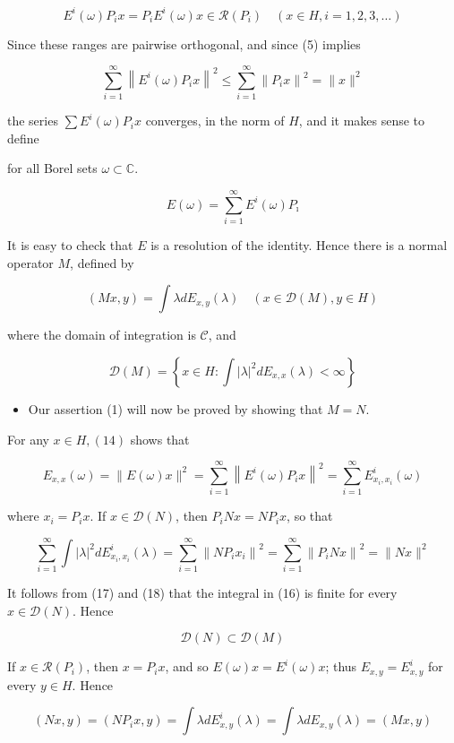 \documentclass[10pt]{article}
\begin{document}
$$
E^{i}(\omega) P_{i} x=P_{i} E^{i}(\omega) x \in \mathscr{R}\left(P_{i}\right) \quad(x \in H, i=1,2,3, \ldots)
$$

Since these ranges are pairwise orthogonal, and since (5) implies

$$
\sum_{i=1}^{\infty}\left\|E^{i}(\omega) P_{i} x\right\|^{2} \leq \sum_{i=1}^{\infty}\left\|P_{i} x\right\|^{2}=\|x\|^{2}
$$

the series $\sum E^{i}(\omega) P_{i} x$ converges, in the norm of $H$, and it makes sense to define

for all Borel sets $\omega \subset \mathbb{C}$.

$$
E(\omega)=\sum_{i=1}^{\infty} E^{i}(\omega) P_{\imath}
$$

It is easy to check that $E$ is a resolution of the identity. Hence there is a normal operator $M$, defined by

$$
(M x, y)=\int \lambda d E_{x, y}(\lambda) \quad(x \in \mathscr{D}(M), y \in H)
$$

where the domain of integration is $\mathscr{C}$, and

$$
\mathscr{D}(M)=\left\{x \in H: \int|\lambda|^{2} d E_{x, x}(\lambda)<\infty\right\}
$$

\begin{itemize}
  \item Our assertion (1) will now be proved by showing that $M=N$.
\end{itemize}

For any $x \in H,(14)$ shows that

$$
E_{x, x}(\omega)=\|E(\omega) x\|^{2}=\sum_{i=1}^{\infty}\left\|E^{i}(\omega) P_{i} x\right\|^{2}=\sum_{i=1}^{\infty} E_{x_{i}, x_{i}}^{i}(\omega)
$$

where $x_{i}=P_{i} x$. If $x \in \mathscr{D}(N)$, then $P_{i} N x=N P_{i} x$, so that

$$
\sum_{i=1}^{\infty} \int|\lambda|^{2} d E_{x_{i}, x_{i}}^{i}(\lambda)=\sum_{i=1}^{\infty}\left\|N P_{i} x_{i}\right\|^{2}=\sum_{i=1}^{\infty}\left\|P_{i} N x\right\|^{2}=\|N x\|^{2}
$$

It follows from (17) and (18) that the integral in (16) is finite for every $x \in \mathscr{D}(N)$. Hence

$$
\mathscr{D}(N) \subset \mathscr{D}(M)
$$

If $x \in \mathscr{R}\left(P_{i}\right)$, then $x=P_{i} x$, and so $E(\omega) x=E^{i}(\omega) x$; thus $E_{x, y}=E_{x, y}^{i}$ for every $y \in H$. Hence

$$
(N x, y)=\left(N P_{i} x, y\right)=\int \lambda d E_{x, y}^{i}(\lambda)=\int \lambda d E_{x, y}(\lambda)=(M x, y)
$$
\end{document}

